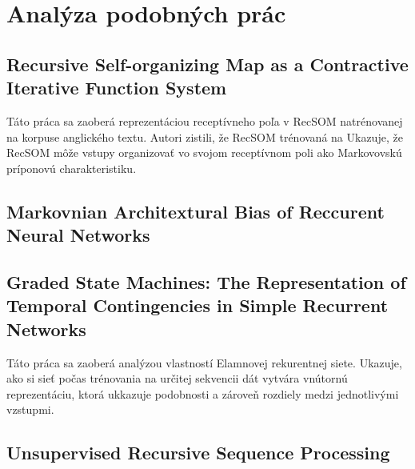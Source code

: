 \chapter{Analýza podobných prác}

\section{Recursive Self-organizing Map
as a Contractive Iterative Function System}

Táto práca sa zaoberá reprezentáciou receptívneho poľa v RecSOM natrénovanej na korpuse anglického textu. Autori zistili, že RecSOM trénovaná na 
Ukazuje, že RecSOM môže vstupy organizovať vo svojom receptívnom poli ako 
Markovovskú príponovú charakteristiku.
\cite{rsm}

\section{Markovnian Architextural Bias of Reccurent Neural Networks }
\cite{markovnian_bias}

\section{
    Graded State Machines: The Representation of Temporal Contingencies in Simple Recurrent Networks
}
\cite{Servan-Schreiber1991}
Táto práca sa zaoberá analýzou vlastností Elamnovej rekurentnej siete.
Ukazuje, ako si sieť počas trénovania na určitej sekvencii dát vytvára vnútornú reprezentáciu, ktorá 
ukkazuje podobnosti a zároveň rozdiely medzi jednotlivými vzstupmi.


\section{
    Unsupervised Recursive Sequence Processing
}

